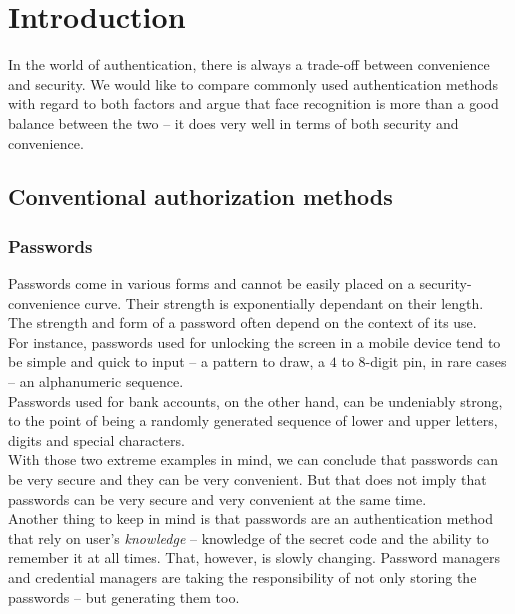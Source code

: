 \section{Introduction}
    In the world of authentication, there is always a trade-off between
    convenience and security. We would like to compare commonly used authentication
    methods with regard to both factors and argue that face recognition is more than
    a good balance between the two -- it does very well in terms of both security
    and convenience.

    \subsection*{Conventional authorization methods}
        \subsubsection*{Passwords}
            Passwords come in various forms and cannot be easily placed on a
            security-convenience curve. Their strength is exponentially dependant
            on their length.\\
            The strength and form of a password often depend on the context of its
            use.\\
            For instance, passwords used for unlocking the screen in a mobile
            device tend to be simple and quick to input -- a pattern to draw, a
            $4$ to $8$-digit pin, in rare cases -- an alphanumeric sequence.\\
            Passwords used for bank accounts, on the other hand, can be undeniably
            strong, to the point of being a randomly generated sequence of lower
            and upper letters, digits and special characters.\\
            With those two extreme examples in mind, we can conclude that passwords
            can be very secure and they can be very convenient. But that does not
            imply that passwords can be very secure and very convenient at the
            same time.\\
            Another thing to keep in mind is that passwords are an authentication
            method that rely on user's \textit{knowledge} -- knowledge of the
            secret code and the ability to remember it at all times. That, however,
            is slowly changing. Password managers and credential managers are taking
            the responsibility of not only storing the passwords -- but generating
            them too.

